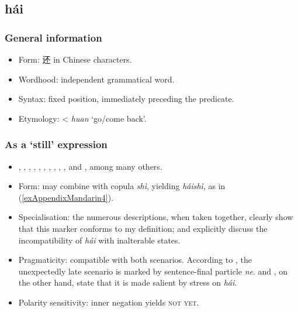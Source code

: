 \subsection{hái}
\label{appendixMandarinHai}
\subsubsection{General information}
\begin{itemize}
	\item Form: {\cn 还} in Chinese characters.
	\item Wordhood: independent grammatical word.
	\item Syntax: fixed position, immediately preceding the predicate.
	\item Etymology: < \textit{huan} \lq go/come back'.
\end{itemize}


\subsubsection{As a \lq{}still\rq{ }expression}
\begin{itemize}
\item 	\textcite[ch. 2.3]{Alleton1972}, \textcite[106–117]{Chu1998}, \textcite[122–127, 142–147]{Donazzan2008}, \textcite{JingSchmidtGries2009}, \textcite[334, 345]{LiThompson1981}, \textcite{Liu2000}, \textcite{Lu2019}, \textcite{Paris1988},  \textcite{Yang2017}, \textcite{Yeh1998}, and \textcite{ZhangLing2016}, among many others.
		\item Form: may combine with copula \textit{shì}, yielding \textit{háishì}, as in (\ref{exAppendixMandarin4}).
	\item Specialisation: the numerous descriptions, when taken together, clearly show that this marker conforms to my definition; \textcite[145]{Donazzan2008} and \textcite[265]{Yeh1998} explicitly discuss the incompatibility of \textit{hái} with inalterable states.
	\item Pragmaticity: compatible with both scenarios. According to \textcite{Paris1988}, the unexpectedly late scenario is marked by sentence-final particle \textit{ne}. \textcite{Chu1998} and \textcite{Liu2000}, on the other hand, state that it is made salient by stress on \textit{hái}.
	\item Polarity sensitivity: inner negation yields \textsc{not yet}.
\end{itemize}

